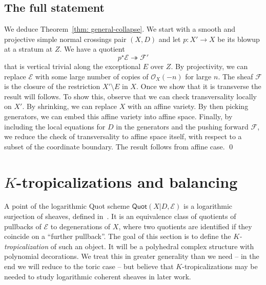 \documentclass[11pt]{amsart}
\theoremstyle{definition}
\theoremstyle{definition}
\begin{document}
\subsection{The full statement} We deduce Theorem~\ref{thm: general-collapse}. We start with a smooth and projective simple normal crossings pair $(X,D)$ and let $p\colon X'\to X$ be its blowup at a stratum at $Z$. We have a quotient
\[
p^\star\mathcal E\twoheadrightarrow \mathcal F'
\]
that is vertical trivial along the exceptional $E$ over $Z$. By projectivity, we can replace $\mathcal E$ with some large number of copies of $\mathcal O_X(-n)$ for large $n$. The sheaf $\mathcal F$ is the closure of the restriction $X'\setminus E$ in $X$. Once we show that it is transverse the result will follows. To show this, observe that we can check transversality locally on $X'$. By shrinking, we can replace $X$ with an affine variety. By then picking generators, we can embed this affine variety into affine space. Finally, by including the local equations for $D$ in the generators and the pushing forward $\mathcal F$, we reduce the check of transversality to affine space itself, with respect to a subset of the coordinate boundary. The result follows from affine case. \qed



\section{$K$-tropicalizations and balancing}\label{sec: K-tropicalizations}


A point of the logarithmic Quot scheme $\mathsf{Quot}(X|D,\mathcal E)$ is a logarithmic surjection of sheaves, defined in~\cite{Logquot}. It is an equivalence class of quotients of pullbacks of $\mathcal E$ to degenerations of $X$, where two quotients are identified if they coincide on a ``further pullback''. The goal of this section is to define the {\it $K$-tropicalization} of such an object. It will be a polyhedral complex structure with polynomial decorations. We treat this in greater generality than we need -- in the end we will reduce to the toric case -- but believe that $K$-tropicalizations may be needed to study logarithmic coherent sheaves in later work.
\end{document}
